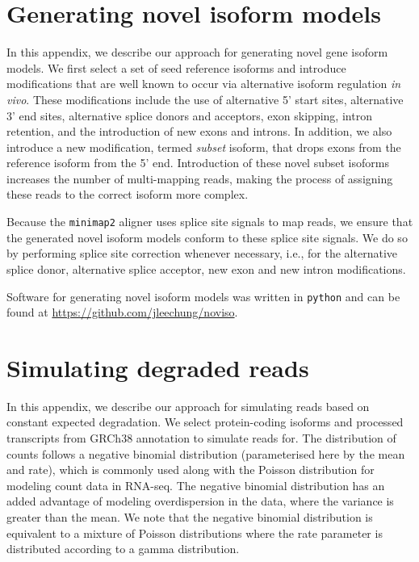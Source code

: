 
\chapter{Generating novel isoform models}\label{ap:gen-novl-iso}

In this appendix, we describe our approach for generating novel gene isoform models. We first select a set of seed reference isoforms and introduce modifications that are well known to occur via alternative isoform regulation \textit{in vivo}. These modifications include the use of alternative 5' start sites, alternative 3' end sites, alternative splice donors and acceptors, exon skipping, intron retention, and the introduction of new exons and introns. In addition, we also introduce a new modification, termed \textit{subset} isoform, that drops exons from the reference isoform from the 5' end. Introduction of these novel subset isoforms increases the number of multi-mapping reads, making the process of assigning these reads to the correct isoform more complex. 


Because the \texttt{minimap2} aligner uses splice site signals to map reads, we ensure that the generated novel isoform models conform to these splice site signals. We do so by performing splice site correction whenever necessary, i.e., for the alternative splice donor, alternative splice acceptor, new exon and new intron modifications. 



Software for generating novel isoform models was written in \texttt{python} and can be found at \url{https://github.com/jleechung/noviso}.

\chapter{Simulating degraded reads}\label{ap:sim-deg-reads}

In this appendix, we describe our approach for simulating reads based on constant expected degradation. We select protein-coding isoforms and processed transcripts from GRCh38 annotation to simulate reads for. The distribution of counts follows a negative binomial distribution (parameterised here by the mean and rate), which is commonly used along with the Poisson distribution for modeling count data in RNA-seq. The negative binomial distribution has an added advantage of modeling overdispersion in the data, where the variance is greater than the mean. We note that the negative binomial distribution is equivalent to a mixture of Poisson distributions where the rate parameter is distributed according to a gamma distribution. 

